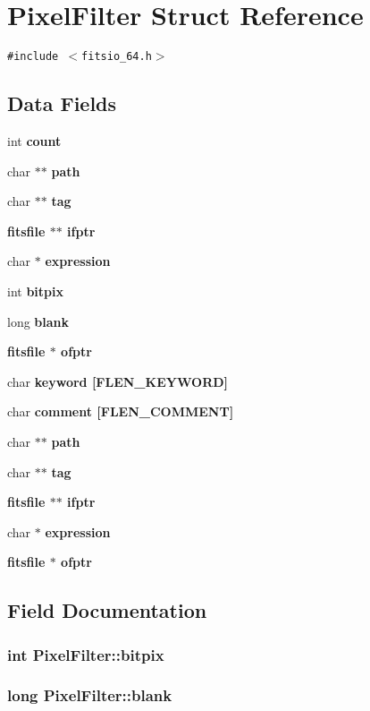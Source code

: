 \section{Pixel\-Filter Struct Reference}
\label{structPixelFilter}
{\tt \#include $<$fitsio\_\-64.h$>$}

\subsection*{Data Fields}
\begin{CompactItemize}
\item 
int \bf{count}
\item 
char $\ast$$\ast$ \bf{path}
\item 
char $\ast$$\ast$ \bf{tag}
\item 
\bf{fitsfile} $\ast$$\ast$ \bf{ifptr}
\item 
char $\ast$ \bf{expression}
\item 
int \bf{bitpix}
\item 
long \bf{blank}
\item 
\bf{fitsfile} $\ast$ \bf{ofptr}
\item 
char \bf{keyword} [FLEN\_\-KEYWORD]
\item 
char \bf{comment} [FLEN\_\-COMMENT]
\item 
char $\ast$$\ast$ \bf{path}
\item 
char $\ast$$\ast$ \bf{tag}
\item 
\bf{fitsfile} $\ast$$\ast$ \bf{ifptr}
\item 
char $\ast$ \bf{expression}
\item 
\bf{fitsfile} $\ast$ \bf{ofptr}
\end{CompactItemize}


\subsection{Field Documentation}
\subsubsection{\setlength{\rightskip}{0pt plus 5cm}int \bf{Pixel\-Filter::bitpix}}\label{structPixelFilter_95dfe3a2d950b0f4d769ad002ff05470}


\subsubsection{\setlength{\rightskip}{0pt plus 5cm}long \bf{Pixel\-Filter::blank}}\label{structPixelFilter_05855896303f3c561e5b126301b0a82d}


